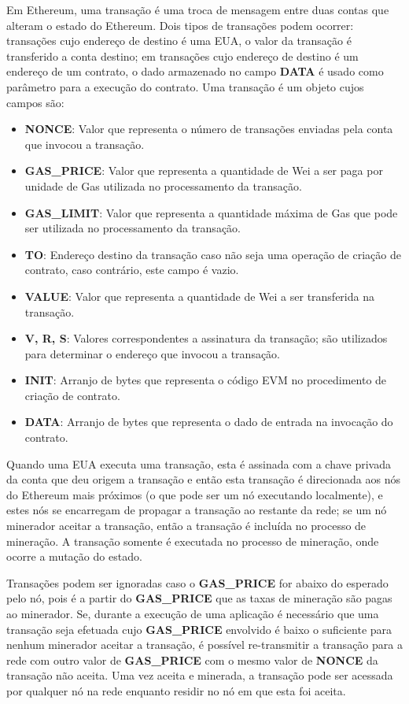 \documentclass[tcc,capa]{texufpel}
\begin{document}
	Em Ethereum, uma transação é uma troca de mensagem entre duas contas que alteram o estado do Ethereum. Dois tipos de transações podem ocorrer: transações cujo endereço de destino é uma EUA, o valor da transação é transferido a conta destino; em transações cujo endereço de destino é um endereço de um contrato, o dado armazenado no campo \textbf{DATA} é usado como parâmetro para a execução do contrato. Uma transação é um objeto cujos campos são:
	
	\begin{itemize}
	    \item \textbf{NONCE}: Valor que representa o número de transações enviadas pela conta que invocou a transação.
	    \item \textbf{GAS\_PRICE}: Valor que representa a quantidade de Wei a ser paga por unidade de Gas utilizada no processamento da transação.
	    \item \textbf{GAS\_LIMIT}: Valor que representa a quantidade máxima de Gas que pode ser utilizada no processamento da transação.
	    \item \textbf{TO}: Endereço destino da transação caso não seja uma operação de criação de contrato, caso contrário, este campo é vazio.
	    \item \textbf{VALUE}: Valor que representa a quantidade de Wei a ser transferida na transação.
	    \item \textbf{V, R, S}: Valores correspondentes a assinatura da transação; são utilizados para determinar o endereço que invocou a transação.
	    \item \textbf{INIT}: Arranjo de bytes que representa o código EVM no procedimento de criação de contrato.
	    \item \textbf{DATA}: Arranjo de bytes que representa o dado de entrada na invocação do contrato.
	\end{itemize}
	
	Quando uma EUA executa uma transação, esta é assinada com a chave privada da conta que deu origem a transação e então esta transação é direcionada aos nós do Ethereum mais próximos (o que pode ser um nó executando localmente), e estes nós se encarregam de propagar a transação ao restante da rede; se um nó minerador aceitar a transação, então a transação é incluída no processo de mineração. A transação somente é executada no processo de mineração, onde ocorre a mutação do estado.
	
	Transações podem ser ignoradas caso o \textbf{GAS\_PRICE} for abaixo do esperado pelo nó, pois é a partir do \textbf{GAS\_PRICE} que as taxas de mineração são pagas ao minerador. Se, durante a execução de uma aplicação é necessário que uma transação seja efetuada cujo \textbf{GAS\_PRICE} envolvido é baixo o suficiente para nenhum minerador aceitar a transação, é possível re-transmitir a transação para a rede com outro valor de \textbf{GAS\_PRICE} com o mesmo valor de \textbf{NONCE} da transação não aceita. Uma vez aceita e minerada, a transação pode ser acessada por qualquer nó na rede enquanto residir no nó em que esta foi aceita.
	
\end{document}
